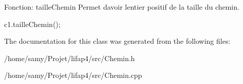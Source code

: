Fonction\+: taille\+Chemin Permet d\textquotesingle{}avoir l\textquotesingle{}entier positif de la taille du chemin. 


\begin{DoxyCode}
c1.tailleChemin();
\end{DoxyCode}
 

The documentation for this class was generated from the following files\+:\begin{DoxyCompactItemize}
\item 
/home/samy/\+Projet/lifap4/src/Chemin.\+h\item 
/home/samy/\+Projet/lifap4/src/Chemin.\+cpp\end{DoxyCompactItemize}
